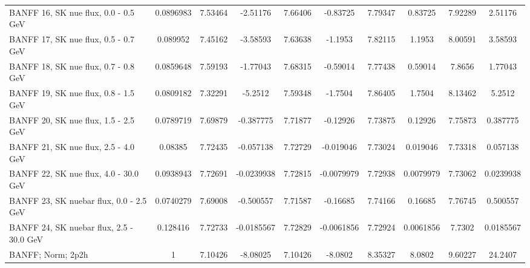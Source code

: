 \documentclass{standalone}
\begin{document}
\begin{tabular}{| l | S | S  S | S  S | S  S | S  S | }
                                            BANFF 16, SK nue flux, 0.0 - 0.5 GeV &       0.0896983 &         7.53464 &        -2.51176 &         7.66406 &        -0.83725 &         7.79347 &         0.83725 &         7.92289 &         2.51176 \\ 
                                            BANFF 17, SK nue flux, 0.5 - 0.7 GeV &        0.089952 &         7.45162 &        -3.58593 &         7.63638 &         -1.1953 &         7.82115 &          1.1953 &         8.00591 &         3.58593 \\ 
                                            BANFF 18, SK nue flux, 0.7 - 0.8 GeV &       0.0859648 &         7.59193 &        -1.77043 &         7.68315 &        -0.59014 &         7.77438 &         0.59014 &          7.8656 &         1.77043 \\ 
                                            BANFF 19, SK nue flux, 0.8 - 1.5 GeV &       0.0809182 &         7.32291 &         -5.2512 &         7.59348 &         -1.7504 &         7.86405 &          1.7504 &         8.13462 &          5.2512 \\ 
                                            BANFF 20, SK nue flux, 1.5 - 2.5 GeV &       0.0789719 &         7.69879 &       -0.387775 &         7.71877 &        -0.12926 &         7.73875 &         0.12926 &         7.75873 &        0.387775 \\ 
                                            BANFF 21, SK nue flux, 2.5 - 4.0 GeV &         0.08385 &         7.72435 &       -0.057138 &         7.72729 &       -0.019046 &         7.73024 &        0.019046 &         7.73318 &        0.057138 \\ 
                                           BANFF 22, SK nue flux, 4.0 - 30.0 GeV &       0.0938943 &         7.72691 &      -0.0239938 &         7.72815 &      -0.0079979 &         7.72938 &       0.0079979 &         7.73062 &       0.0239938 \\ 
                                         BANFF 23, SK nuebar flux, 0.0 - 2.5 GeV &       0.0740279 &         7.69008 &       -0.500557 &         7.71587 &        -0.16685 &         7.74166 &         0.16685 &         7.76745 &        0.500557 \\ 
                                        BANFF 24, SK nuebar flux, 2.5 - 30.0 GeV &        0.128416 &         7.72733 &      -0.0185567 &         7.72829 &      -0.0061856 &         7.72924 &       0.0061856 &          7.7302 &       0.0185567 \\ 
                                                               BANFF; Norm; 2p2h &               1 &         7.10426 &        -8.08025 &         7.10426 &         -8.0802 &         8.35327 &          8.0802 &         9.60227 &         24.2407 \\ 

\end{tabular}
\end{document}
